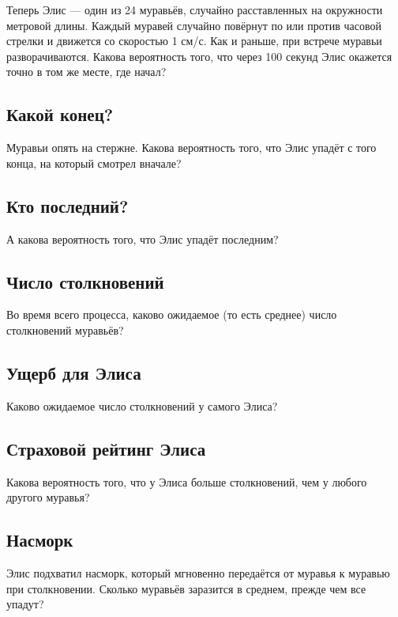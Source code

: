Теперь Элис --- один из 24 муравьёв, случайно расставленных на окружности метровой длины.
Каждый муравей случайно повёрнут по или против часовой стрелки и движется со скоростью 1 см/с.
Как и раньше, при встрече муравьи разворачиваются.
Какова вероятность того, что через 100 секунд Элис окажется точно в том же месте, где начал?

\subsection*{Какой конец?}

Муравьи опять на стержне.
Какова вероятность того, что Элис упадёт с того конца, на который смотрел вначале?

\subsection*{Кто последний?}

А какова вероятность того, что Элис упадёт последним?

\subsection*{Число столкновений}

Во время всего процесса, каково ожидаемое (то есть среднее) число столкновений муравьёв?

\subsection*{Ущерб для Элиса}

Каково ожидаемое число столкновений у самого Элиса?

\subsection*{Страховой рейтинг Элиса}

Какова вероятность того, что у Элиса больше столкновений, чем у любого другого муравья?

\subsection*{Насморк}

Элис подхватил насморк, который мгновенно передаётся от муравья к муравью при столкновении. Сколько муравьёв заразится в среднем, прежде чем все упадут?

